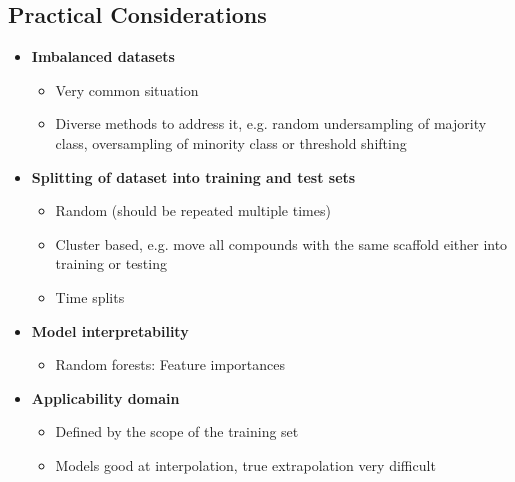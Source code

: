 \subsection{Practical Considerations}

\begin{itemize}
    \item \textbf{Imbalanced datasets}
    \begin{itemize}
        \item Very common situation
        \item Diverse methods to address it, e.g. random undersampling of majority class, oversampling of minority class or threshold shifting
    \end{itemize}
    \item \textbf{Splitting of dataset into training and test sets}
    \begin{itemize}
        \item Random (should be repeated multiple times)
        \item Cluster based, e.g. move all compounds with the same scaffold either into training or testing
        \item Time splits
    \end{itemize}
    \item \textbf{Model interpretability}
    \begin{itemize}
        \item Random forests: Feature importances
    \end{itemize}
    \item \textbf{Applicability domain}
    \begin{itemize}
        \item Defined by the scope of the training set
        \item Models good at interpolation, true extrapolation very difficult
    \end{itemize}
\end{itemize}